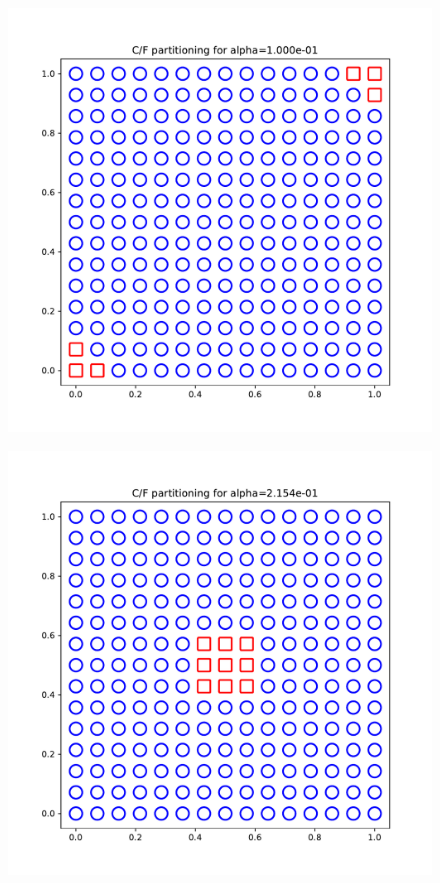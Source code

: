\documentclass{article}
\begin{document}
\begin{figure}[h]
  \includegraphics[width=\textwidth]{figures/cf_7.pdf}
\end{figure}

\begin{figure}[h]
  \includegraphics[width=\textwidth]{figures/cf_8.pdf}
\end{figure}
\end{document}
